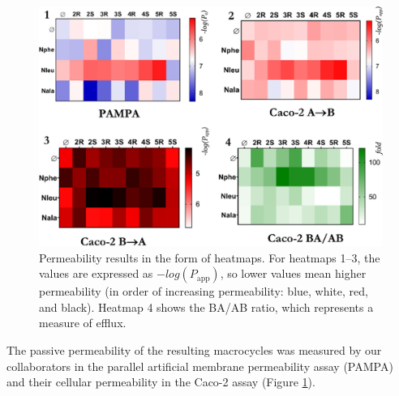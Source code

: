 \begin{figure}[h!]
    \centering
    \includegraphics[width=\textwidth]{7_chapter_5/fig/intro/pampa.jpeg}
    \caption{Permeability results in the form of heatmaps. For heatmaps 1–3, the values are expressed as $−log(P_{\text{app}})$, so lower values mean higher permeability (in order of increasing permeability: blue, white, red, and black). Heatmap 4 shows the BA/AB ratio, which represents a measure of efflux.}
    \label{fig:permAssays}
\end{figure}
The passive permeability of the resulting macrocycles was measured by our collaborators in the parallel artificial membrane permeability assay (PAMPA)\cite{Ottaviani2006,Di2015} and their cellular permeability in the Caco-2 assay\cite{Fogh1977,Di2015} (Figure \ref{fig:permAssays}).\cite{Comeau2021}

